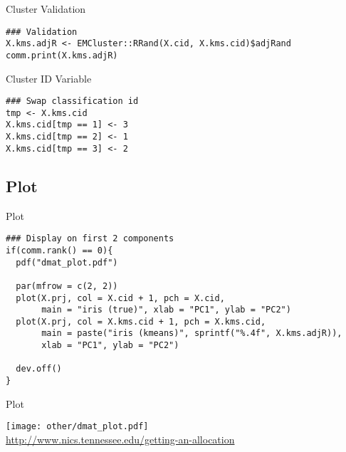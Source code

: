 \begin{frame}[fragile]
  \begin{block}{Cluster Validation}\pause
\begin{lstlisting}
### Validation
X.kms.adjR <- EMCluster::RRand(X.cid, X.kms.cid)$adjRand
comm.print(X.kms.adjR)
\end{lstlisting}
\end{block}
\end{frame}

\begin{frame}[fragile]
  \begin{block}{Cluster ID Variable}\pause
\begin{lstlisting}
### Swap classification id
tmp <- X.kms.cid
X.kms.cid[tmp == 1] <- 3
X.kms.cid[tmp == 2] <- 1
X.kms.cid[tmp == 3] <- 2
\end{lstlisting}
\end{block}
\end{frame}

\subsection{Plot}

\begin{frame}[fragile]
  \begin{block}{Plot}\pause
\begin{lstlisting}
### Display on first 2 components
if(comm.rank() == 0){
  pdf("dmat_plot.pdf")
  
  par(mfrow = c(2, 2))
  plot(X.prj, col = X.cid + 1, pch = X.cid,
       main = "iris (true)", xlab = "PC1", ylab = "PC2")
  plot(X.prj, col = X.kms.cid + 1, pch = X.kms.cid,
       main = paste("iris (kmeans)", sprintf("%.4f", X.kms.adjR)),
       xlab = "PC1", ylab = "PC2")
  
  dev.off()
}
\end{lstlisting}
\end{block}
\end{frame}


\begin{frame}
  \begin{block}{Plot}\pause
\begin{center}
  \texttt{[image: other/dmat\_plot.pdf]}\\
 \vspace{-1cm}\url{http://www.nics.tennessee.edu/getting-an-allocation} 
\end{center}
\end{block}
\end{frame}